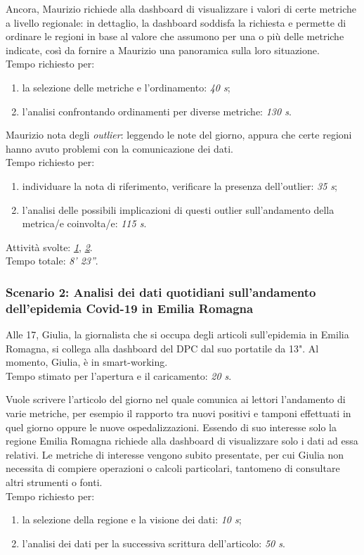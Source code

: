 Ancora, Maurizio richiede alla dashboard di visualizzare i valori di certe metriche a livello regionale: in dettaglio, la dashboard soddisfa la richiesta e permette di ordinare le regioni in base al valore che assumono per una o più delle metriche indicate, così da fornire a Maurizio una panoramica sulla loro situazione.\\
Tempo richiesto per:
\begin{enumerate}
    \item la selezione delle metriche e l'ordinamento: \textit{40 s};
    \item l'analisi confrontando ordinamenti per diverse metriche: \textit{130 s}.
\end{enumerate}

Maurizio nota degli \textit{outlier}:  leggendo le note del giorno, appura che certe regioni hanno avuto problemi con la comunicazione dei dati.\\
Tempo richiesto per:
\begin{enumerate}
    \item individuare la nota di riferimento, verificare la presenza dell'outlier: \textit{35 s};
    \item l'analisi delle possibili implicazioni di questi outlier sull'andamento della metrica/e coinvolta/e: \textit{115 s}.
\end{enumerate}
\noindent
Attività svolte: \hyperref[itm:1]{\textit{1}}, \hyperref[itm:2]{\textit{2}}.\\ 
Tempo totale: \textit{8' 23''}. 

\subsubsection*{Scenario 2: Analisi dei dati quotidiani sull'andamento dell'epidemia Covid-19 in Emilia Romagna}
Alle 17, Giulia, la giornalista che si occupa degli articoli sull'epidemia in Emilia Romagna, si collega alla dashboard del DPC dal suo portatile da 13". Al momento, Giulia, è in smart-working.\\
Tempo stimato per l'apertura e il caricamento: \textit{20 s}. 

Vuole scrivere l'articolo del giorno nel quale comunica ai lettori l'andamento di varie metriche, per esempio il rapporto tra nuovi positivi e tamponi effettuati in quel giorno oppure le nuove ospedalizzazioni. Essendo di suo interesse solo la regione Emilia Romagna richiede alla dashboard di visualizzare solo i dati ad essa relativi. Le metriche di interesse vengono subito presentate, per cui Giulia non necessita di compiere operazioni o calcoli particolari, tantomeno di consultare altri strumenti o fonti.\\
Tempo richiesto per:
\begin{enumerate}
    \item la selezione della regione e la visione dei dati: \textit{10 s};
    \item l'analisi dei dati per la successiva scrittura dell'articolo: \textit{50 s}.
\end{enumerate}


